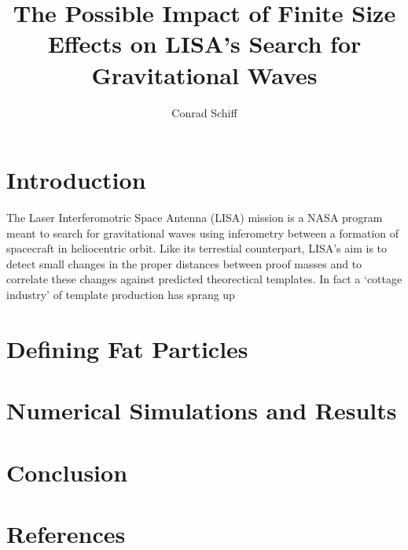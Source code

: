\documentclass[12pt]{article}
\begin{document}
\title{The Possible Impact of Finite Size Effects on LISA's Search for Gravitational Waves}
\author{Conrad Schiff}
\maketitle

\section{Introduction}

The Laser Interferomotric Space Antenna (LISA) mission is a NASA
program meant to search for gravitational waves using inferometry
between a formation of spacecraft in heliocentric orbit. Like its
terrestial counterpart, LISA's aim is to detect small changes in
the proper distances between proof masses and to correlate these changes
against predicted theorectical templates. In fact a `cottage industry' of
template production has sprang up
\section{Defining Fat Particles}

\section{Numerical Simulations and Results}

\section{Conclusion}

\section{References}
\end{document}
